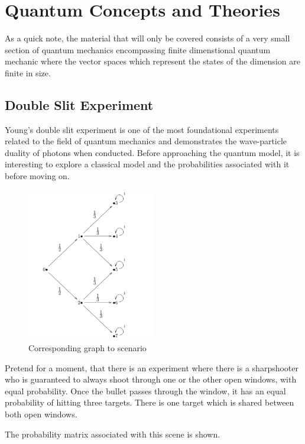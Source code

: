 \documentclass[12pt]{article}
\begin{document}
\section{Quantum Concepts and Theories}

As a quick note, the material that will only be covered consists of a very small section of quantum mechanics encompassing finite dimenstional quantum mechanic where the vector spaces which represent the states of the dimension are finite in size.\par

\subsection{Double Slit Experiment}
Young's double slit experiment is one of the most foundational experiments related to the field of quantum mechanics and demonstrates the wave-particle duality of photons when conducted. Before approaching the quantum model, it is interesting to explore a classical model and the probabilities associated with it before moving on.\par
\begin{figure}
  \centering
  \includegraphics[width=0.5\textwidth]{classicslit}
  \caption{Corresponding graph to scenario}
\end{figure}
Pretend for a moment, that there is an experiment where there is a sharpshooter who is guaranteed to always shoot through one or the other open windows, with equal probability. Once the bullet passes through the window, it has an equal probability of hitting three targets. There is one target which is shared between both open windows.\par
The probability matrix associated with this scene is shown. 
\end{document}
